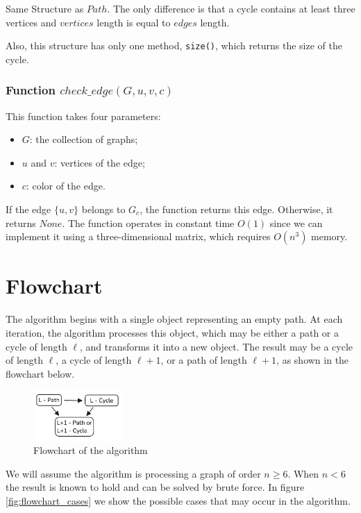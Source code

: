 Same Structure as $Path$. The only difference is that a cycle contains
at least three vertices and $vertices$ length is equal to $edges$ length.

Also, this structure has only one method, \texttt{size()}, which returns the size of the cycle.

\subsubsection{Function $check\_edge(G, u, v, c)$}

This function takes four parameters:

\begin{itemize}
    \item $G$: the collection of graphs;
    \item $u$ and $v$: vertices of the edge;
    \item $c$: color of the edge.
\end{itemize}

If the edge $\{u, v\}$ belongs to $G_c$, the function returns this edge. Otherwise, it returns $None$. 
The function operates in constant time $O(1)$ since we can implement it using a three-dimensional matrix, 
which requires $O(n^3)$ memory.

\section{Flowchart}

The algorithm begins with a single object representing an empty path. At 
each iteration, the algorithm processes this object, which may be either 
a path or a cycle of length $\ell$, and transforms it into a new object. 
The result may be a cycle of length $\ell$, a cycle of length $\ell+1$, or 
a path of length $\ell+1$, as shown in the flowchart below.

\begin{figure}[H]
    \centering
    \includegraphics[width=0.3\textwidth]{figuras/flowchart.png}
    \caption{Flowchart of the algorithm}
    \label{fig:flowchart}
\end{figure}

We will assume the algorithm is processing a graph of order $n \geq 6$. When $n < 6$ the result is known to hold
and can be solved by brute force. In figure \ref{fig:flowchart_cases} we show the possible cases that
may occur in the algorithm.

